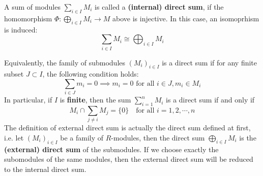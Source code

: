 \begin{definition}
    A sum of modules \(\sum_{i \in I} M_i\) is called a \textbf{(internal) direct sum}, if the homomorphism \(\Phi: \bigoplus_{i \in I}M_i \to M\) above is injective. In this case, an isomoprhism is induced:
    \[\sum_{i \in I} M_i \cong \bigoplus_{i \in I}M_i\]
\end{definition}

\begin{remark}
    Equivalently, the family of submodules \((M_i)_{i \in I}\) is a direct sum if for any finite subset \(J \subset I\), the following condition holds:
    \[\sum_{i \in J} m_i = 0 \implies m_i = 0 \text{ for all } i \in J, m_i \in M_i\]
    In particular, if \(I\) is \textbf{finite}, then the sum \(\sum_{i=1}^n M_i\) is a direct sum if and only if
    \[M_i \cap \sum_{j \neq i}M_j = \{0\} \quad \text{for all } i=1,2,\cdots,n\]
    The definition of external direct sum is actually the direct sum defined at first, i.e. let \((M_i)_{i \in I}\) be a family of \(R\)-modules, then the direct sum \(\bigoplus_{i \in I} M_i\) is the \textbf{(external) direct sum} of the submodules. If we choose exactly the subomodules of the same modules, then the external direct sum will be reduced to the internal direct sum.
\end{remark}

